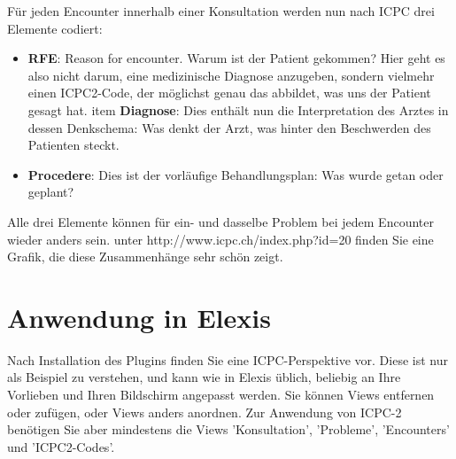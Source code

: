 \documentclass[a4paper]{scrartcl}
\begin{document}
\medskip

Für jeden Encounter innerhalb einer Konsultation werden nun nach ICPC drei Elemente codiert:
\begin{itemize}
\item \textbf{RFE}: Reason for encounter. Warum ist der Patient gekommen? Hier geht es also nicht darum, eine medizinische Diagnose anzugeben, sondern vielmehr einen ICPC2-Code, der möglichst genau das abbildet, was uns der Patient gesagt hat.
item \textbf{Diagnose}: Dies enthält nun die Interpretation des Arztes in dessen Denkschema: Was denkt der Arzt, was hinter den Beschwerden des Patienten steckt.
\item \textbf{Procedere}: Dies ist der vorläufige Behandlungsplan: Was wurde getan oder geplant?
\end{itemize}

Alle drei Elemente können für ein- und dasselbe Problem bei jedem Encounter wieder anders sein. unter http://www.icpc.ch/index.php?id=20 finden Sie eine Grafik, die diese Zusammenhänge sehr schön zeigt.

\section{Anwendung in Elexis}
Nach Installation des Plugins finden Sie eine ICPC-Perspektive vor. Diese ist nur als Beispiel zu verstehen, und kann wie in Elexis üblich, beliebig an Ihre Vorlieben und Ihren Bildschirm angepasst werden. Sie können Views entfernen oder zufügen, oder Views anders anordnen.
Zur Anwendung von ICPC-2 benötigen Sie aber mindestens die Views 'Konsultation', 'Probleme', 'Encounters' und 'ICPC2-Codes'.
\end{document}
